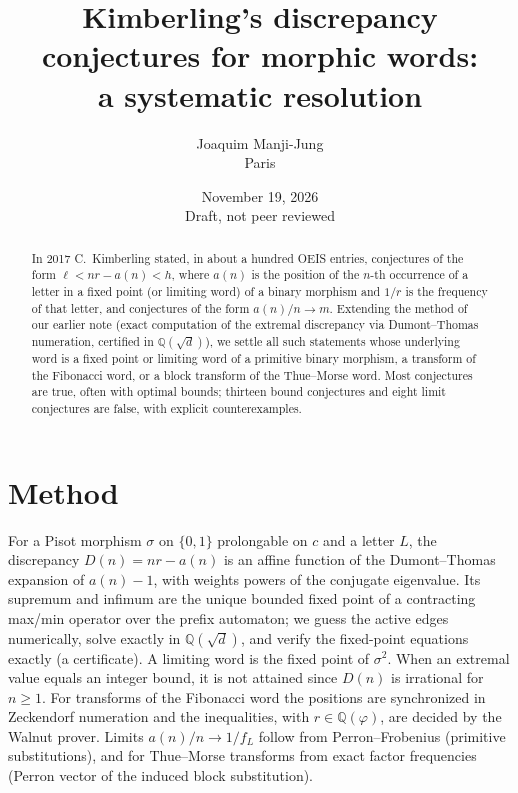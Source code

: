 \documentclass[11pt]{article}
\title{Kimberling's discrepancy conjectures for morphic words:\\ a systematic resolution}
\author{Joaquim Manji-Jung\\ Paris}
\date{November 19, 2026\\[2pt] {\small Draft, not peer reviewed}}
\begin{document}
\maketitle
\begin{abstract}
In 2017 C.~Kimberling stated, in about a hundred OEIS entries, conjectures of the form
$\ell < n r - a(n) < h$, where $a(n)$ is the position of the $n$-th occurrence of a letter in a fixed point
(or limiting word) of a binary morphism and $1/r$ is the frequency of that letter, and conjectures of the form
$a(n)/n \to m$. Extending the method of our earlier note (exact computation of the extremal discrepancy via
Dumont--Thomas numeration, certified in $\mathbb{Q}(\sqrt d)$), we settle all such statements whose underlying
word is a fixed point or limiting word of a primitive binary morphism, a transform of the Fibonacci word, or a
block transform of the Thue--Morse word. Most conjectures are true, often with optimal bounds; thirteen bound
conjectures and eight limit conjectures are false, with explicit counterexamples.
\end{abstract}

\section{Method}
For a Pisot morphism $\sigma$ on $\{0,1\}$ prolongable on $c$ and a letter $L$, the discrepancy
$D(n) = n r - a(n)$ is an affine function of the Dumont--Thomas expansion of $a(n)-1$, with weights powers of the
conjugate eigenvalue. Its supremum and infimum are the unique bounded fixed point of a contracting max/min operator
over the prefix automaton; we guess the active edges numerically, solve exactly in $\mathbb{Q}(\sqrt d)$, and verify
the fixed-point equations exactly (a certificate). A limiting word is the fixed point of $\sigma^2$. When an extremal
value equals an integer bound, it is not attained since $D(n)$ is irrational for $n\ge1$. For transforms of the
Fibonacci word the positions are synchronized in Zeckendorf numeration and the inequalities, with $r\in\mathbb{Q}(\varphi)$,
are decided by the Walnut prover. Limits $a(n)/n\to 1/f_L$ follow from Perron--Frobenius (primitive substitutions),
and for Thue--Morse transforms from exact factor frequencies (Perron vector of the induced block substitution).
\end{document}

